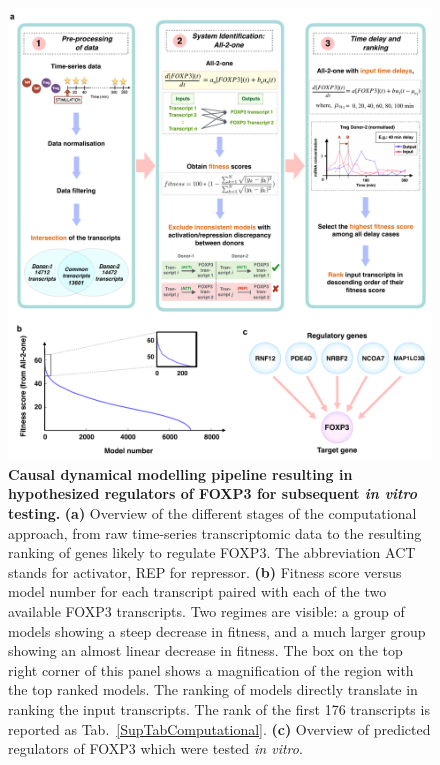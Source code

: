 \documentclass[oneside, 10pt, a4paper, twocolumn]{article}
\begin{document}
\begin{figure}
    \centering
    \includegraphics[scale=0.73]{Fig1_AllInOne.pdf}
  \caption{\textbf{Causal dynamical modelling pipeline resulting in hypothesized regulators of FOXP3 for subsequent \textit{in vitro} testing.} \textbf{(a)} Overview of the different stages of the computational approach, from raw time-series transcriptomic data to the resulting ranking of genes likely to regulate FOXP3. The abbreviation ACT stands for activator, REP for repressor. \textbf{(b)} Fitness score versus model number for each transcript paired with each of the two available FOXP3 transcripts. Two regimes are visible: a group of models showing a steep decrease in fitness, and a much larger group showing an almost linear decrease in fitness. The box on the top right corner of this panel shows a magnification of the region with the top ranked models. The ranking of models directly translate in ranking the input transcripts. The rank of the first 176 transcripts is reported as Tab.~\ref{SupTabComputational}. \textbf{(c)} Overview of predicted regulators of FOXP3 which were tested \textit{in vitro}.
  }
  \label{fig:ComputationalFigure}
\end{figure}
\end{document}
